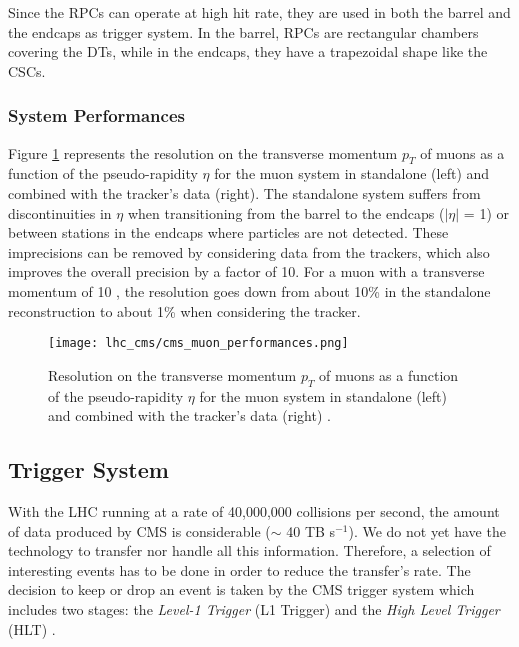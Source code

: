                 Since the RPCs can operate at high hit rate, they are used in both the barrel and the endcaps as trigger system. In the barrel, RPCs are rectangular chambers covering the DTs, while in the endcaps, they have a trapezoidal shape like the CSCs.

            \subsubsection{System Performances}
            \label{sec:muon_chambers__system_performances}

                Figure \ref{fig:muon_chambers__performances} represents the resolution on the transverse momentum $ p_T $ of muons as a function of the pseudo-rapidity $ \eta $ for the muon system in standalone (left) and combined with the tracker's data (right). The standalone system suffers from discontinuities in $ \eta $ when transitioning from the barrel to the endcaps ($ | \eta | $ = 1) or between stations in the endcaps where particles are not detected. These imprecisions can be removed by considering data from the trackers, which also improves the overall precision by a factor of 10. For a muon with a transverse momentum of 10 \GeVc{}, the resolution goes down from about 10\% in the standalone reconstruction to about 1\% when considering the tracker.

                \begin{figure}[h!]
                    \centering
                    \texttt{[image: lhc\_cms/cms\_muon\_performances.png]}
                    \caption{Resolution on the transverse momentum $ p_T $ of muons as a function of the pseudo-rapidity $ \eta $ for the muon system in standalone (left) and combined with the tracker's data (right) \Cite{CMS_Performances}.}
                    \label{fig:muon_chambers__performances}
                \end{figure}            

        \subsection{Trigger System}

            With the LHC running at a rate of 40,000,000 collisions per second, the amount of data produced by CMS is considerable ($ \sim $ 40 TB s$ ^{-1} $). We do not yet have the technology to transfer nor handle all this information. Therefore, a selection of interesting events has to be done in order to reduce the transfer's rate. The decision to keep or drop an event is taken by the CMS trigger system which includes two stages: the \emph{Level-1 Trigger} (L1 Trigger) and the \emph{High Level Trigger} (HLT) \Cite{CMS_at_LHC}. \\

